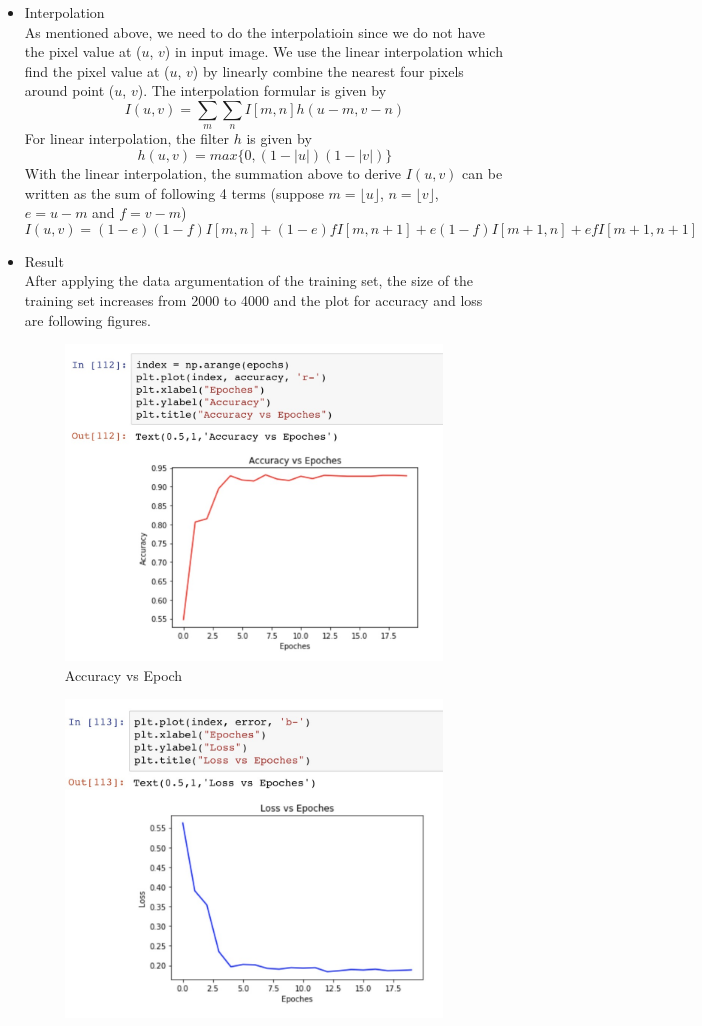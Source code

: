 \documentclass[12pt]{article}
\begin{document}
\begin{itemize}
		\item Interpolation \\
		As mentioned above, we need to do the interpolatioin since we do not have the pixel value at ($u$, $v$) in input image. We use the linear interpolation which find the pixel value at ($u$, $v$) by linearly combine the nearest four pixels around point ($u$, $v$). The interpolation formular is given by
	  $$I(u, v) = \sum_m \sum_n I[m, n]h(u-m, v-n)$$
	  For linear interpolation, the filter $h$ is given by
	  $$h(u, v) = max\{0, (1-|u|)(1-|v|)\}$$
	  With the linear interpolation, the summation above to derive $I(u, v)$ can be written as the sum of following 4 terms (suppose $m = \lfloor u\rfloor$, $n = \lfloor v\rfloor$, $e = u - m$ and $f = v - m$)
		\begin{dmath}
	  I(u, v) = (1-e)(1-f)I[m,n] + (1-e)fI[m, n+1] + e(1-f)I[m+1, n]+efI[m+1, n+1]
		\end{dmath}
		\item Result \\
		After applying the data argumentation of the training set, the size of the training set increases from 2000 to 4000 and the plot for accuracy and loss are following figures.
		\begin{figure}[ht]
			\begin{center}
				\includegraphics[width = 10cm]{da_acc}
			\end{center}
			\caption{Accuracy vs Epoch}
		\end{figure}
		\begin{figure}[!h]
			\begin{center}
				\includegraphics[width = 10cm]{da_loss}

\end{center}
\end{figure}
\end{itemize}
\end{document}
